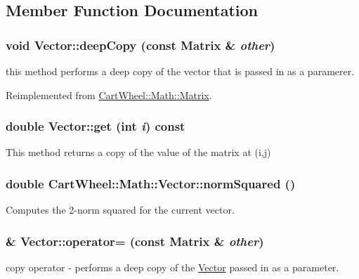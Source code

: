 \subsection{Member Function Documentation}
\hypertarget{classCartWheel_1_1Math_1_1Vector_aecfcd019a564ab7b9f71e2585de515f6}{
\subsubsection[{deepCopy}]{\setlength{\rightskip}{0pt plus 5cm}void Vector::deepCopy (const {\bf Matrix} \& {\em other})}}
\label{classCartWheel_1_1Math_1_1Vector_aecfcd019a564ab7b9f71e2585de515f6}
this method performs a deep copy of the vector that is passed in as a paramerer. 

Reimplemented from \hyperlink{classCartWheel_1_1Math_1_1Matrix_ae2507575dc309db73a9728f7434b3ac3}{CartWheel::Math::Matrix}.

\hypertarget{classCartWheel_1_1Math_1_1Vector_a029056849abdef56a0858d4753cd8274}{
\subsubsection[{get}]{\setlength{\rightskip}{0pt plus 5cm}double Vector::get (int {\em i}) const}}
\label{classCartWheel_1_1Math_1_1Vector_a029056849abdef56a0858d4753cd8274}
This method returns a copy of the value of the matrix at (i,j) \hypertarget{classCartWheel_1_1Math_1_1Vector_aa5d753fb504bac7f71960daf1ae85f13}{
\subsubsection[{normSquared}]{\setlength{\rightskip}{0pt plus 5cm}double CartWheel::Math::Vector::normSquared ()}}
\label{classCartWheel_1_1Math_1_1Vector_aa5d753fb504bac7f71960daf1ae85f13}
Computes the 2-\/norm squared for the current vector. \hypertarget{classCartWheel_1_1Math_1_1Vector_a1ec609f24d97d79e99b6bfc8759863e1}{
\subsubsection[{operator=}]{ \& Vector::operator= (const {\bf Matrix} \& {\em other})}}
\label{classCartWheel_1_1Math_1_1Vector_a1ec609f24d97d79e99b6bfc8759863e1}
copy operator -\/ performs a deep copy of the \hyperlink{classCartWheel_1_1Math_1_1Vector}{Vector} passed in as a parameter. 

